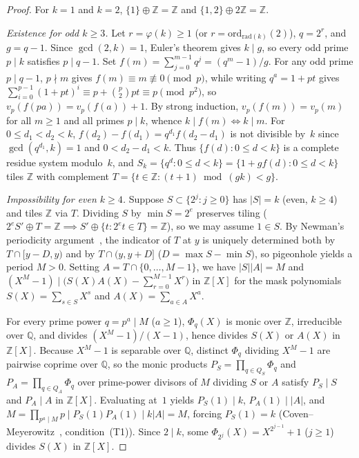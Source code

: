 \documentclass[11pt]{article}
\begin{document}
\begin{proof}
For $k = 1$ and $k = 2$, $\{1\} \oplus \mathbb{Z} = \mathbb{Z}$ and $\{1, 2\} \oplus 2\mathbb{Z} = \mathbb{Z}$.

\emph{Existence for odd $k \ge 3$.} Let $r = \varphi(k) \ge 1$ (or $r = \mathrm{ord}_{\mathrm{rad}(k)}(2)$), $q = 2^r$, and $g = q - 1$. Since $\gcd(2, k) = 1$, Euler's theorem gives $k \mid g$, so every odd prime $p \mid k$ satisfies $p \mid q - 1$. Set $f(m) = \sum_{j=0}^{m-1} q^j = (q^m - 1)/g$. For any odd prime $p \mid q - 1$, $p \nmid m$ gives $f(m) \equiv m \not\equiv 0 \pmod{p}$, while writing $q^a = 1 + pt$ gives $\sum_{i=0}^{p-1} (1 + pt)^i \equiv p + \binom{p}{2} pt \equiv p \pmod{p^2}$, so $v_p(f(pa)) = v_p(f(a)) + 1$. By strong induction, $v_p(f(m)) = v_p(m)$ for all $m \ge 1$ and all primes $p \mid k$, whence $k \mid f(m) \iff k \mid m$. For $0 \le d_1 < d_2 < k$, $f(d_2) - f(d_1) = q^{d_1} f(d_2 - d_1)$ is not divisible by~$k$ since $\gcd(q^{d_1}, k) = 1$ and $0 < d_2 - d_1 < k$. Thus $\{f(d) : 0 \le d < k\}$ is a complete residue system modulo~$k$, and $S_k = \{q^d : 0 \le d < k\} = \{1 + g f(d) : 0 \le d < k\}$ tiles $\mathbb{Z}$ with complement $T = \{t \in \mathbb{Z} : (t + 1) \bmod (gk) < g\}$.

\emph{Impossibility for even $k \ge 4$.} Suppose $S \subset \{2^j : j \ge 0\}$ has $|S| = k$ (even, $k \ge 4$) and tiles $\mathbb{Z}$ via $T$. Dividing $S$ by $\min S = 2^e$ preserves tiling ($2^e S' \oplus T = \mathbb{Z} \implies S' \oplus \{t : 2^e t \in T\} = \mathbb{Z}$), so we may assume $1 \in S$. By Newman's periodicity argument~\cite{Newman1977}, the indicator of $T$ at $y$ is uniquely determined both by $T \cap [y - D, y)$ and by $T \cap (y, y + D]$ ($D = \max S - \min S$), so pigeonhole yields a period $M > 0$. Setting $A = T \cap \{0, \dots, M-1\}$, we have $|S||A| = M$ and $(X^M - 1) \mid \bigl(S(X) A(X) - \sum_{r=0}^{M-1} X^r\bigr)$ in $\mathbb{Z}[X]$ for the mask polynomials $S(X) = \sum_{s \in S} X^s$ and $A(X) = \sum_{a \in A} X^a$.

For every prime power $q = p^a \mid M$ ($a \ge 1$), $\Phi_q(X)$ is monic over $\mathbb{Z}$, irreducible over $\mathbb{Q}$, and divides $(X^M - 1)/(X - 1)$, hence divides $S(X)$ or $A(X)$ in $\mathbb{Z}[X]$. Because $X^M - 1$ is separable over $\mathbb{Q}$, distinct $\Phi_q$ dividing $X^M - 1$ are pairwise coprime over $\mathbb{Q}$, so the monic products $P_S = \prod_{q \in Q_S} \Phi_q$ and $P_A = \prod_{q \in Q_A} \Phi_q$ over prime-power divisors of $M$ dividing $S$ or $A$ satisfy $P_S \mid S$ and $P_A \mid A$ in $\mathbb{Z}[X]$. Evaluating at~$1$ yields $P_S(1) \mid k$, $P_A(1) \mid |A|$, and $M = \prod_{p^a \mid M} p \mid P_S(1) P_A(1) \mid k |A| = M$, forcing $P_S(1) = k$ (Coven--Meyerowitz~\cite{CovenMeyerowitz1999}, condition~(T1)). Since $2 \mid k$, some $\Phi_{2^j}(X) = X^{2^{j-1}} + 1$ ($j \ge 1$) divides $S(X)$ in $\mathbb{Z}[X]$.


\end{proof}
\end{document}
